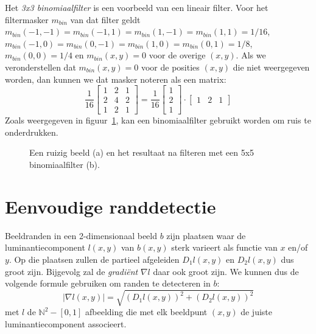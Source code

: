 Het \emph{3x3 binomiaalfilter} is een voorbeeld van een lineair filter. Voor het filtermasker 
$m_{bin}$ van dat filter geldt $m_{bin}(-1,-1)=m_{bin}(-1,1)=m_{bin}(1,-1)=m_{bin}(1,1)=1/16$, 
$m_{bin}(-1,0)=m_{bin}(0,-1)=m_{bin}(1,0)=m_{bin}(0,1)=1/8$, $m_{bin}(0,0)=1/4$ en 
$m_{bin}(x,y)=0$ voor de overige $(x,y)$. Als we veronderstellen dat $m_{bin}(x,y)=0$ voor de 
posities $(x,y)$ die niet weergegeven worden, dan kunnen we dat masker noteren als een matrix:
$$
\frac{1}{16}\left[ \begin{array}{ccc} 1 & 2 & 1\\ 2 & 4 & 2\\ 1 & 2 & 1 \end{array} \right]
= \frac{1}{16}\left[ \begin{array}{c} 1\\ 2\\ 1 \end{array} \right] \cdot 
\left[ \begin{array}{ccc} 1 & 2 & 1 \end{array} \right]
$$
Zoals weergegeven in figuur~\ref{fig:indische_ruizig_en_binom}, kan een binomiaalfilter gebruikt worden om ruis te onderdrukken.

\begin{figure}[tb]
\begin{center}
\caption{\label{fig:indische_ruizig_en_binom}Een ruizig beeld (a) en het resultaat na filteren met een 5x5 binomiaalfilter (b).}
\end{center}
\end{figure}

\section{Eenvoudige randdetectie}

Beeldranden in een 2-dimensionaal beeld $b$ zijn plaatsen waar de luminantiecomponent $l(x,y)$ van $b(x,y)$ 
sterk varieert als functie van $x$ en/of $y$. Op die plaatsen zullen de partieel afgeleiden $D_1 l(x,y)$ en 
$D_2 l(x,y)$ dus groot zijn. Bijgevolg zal de \emph{gradi\"ent} $\nabla l$ daar ook groot zijn. We kunnen 
dus de volgende formule gebruiken om randen te detecteren in $b$: 
$$
|\nabla l(x,y)| = \sqrt{(D_1 l(x,y))^2 + (D_2 l(x,y))^2}
$$ 
met $l$ de $\mathbb{N}^2 - [0,1]$ afbeelding die met elk beeldpunt $(x,y)$ de juiste luminantiecomponent associeert.

